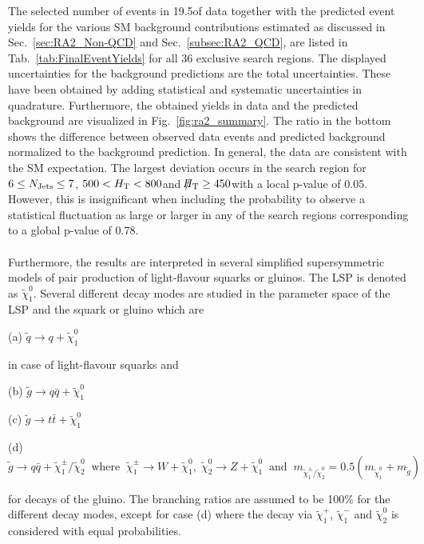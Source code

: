 The selected number of events in 19.5\fbinv of data together with the predicted event yields for the various SM background contributions estimated as discussed in Sec.~\ref{sec:RA2_Non-QCD} and Sec.~\ref{subsec:RA2_QCD}, are listed in Tab.~\ref{tab:FinalEventYields} for all 36 exclusive search regions. The displayed uncertainties for the background predictions are the total uncertainties. These have been obtained by adding statistical and systematic uncertainties in quadrature. Furthermore, the obtained yields in data and the predicted background are visualized in Fig.~\ref{fig:ra2_summary}. The ratio in the bottom shows the difference between observed data events and predicted background normalized to the background prediction. In general, the data are consistent with the SM expectation. The largest deviation occurs in the search region for $6 \leq N_{\text{Jets}} \leq 7$, $500 < H_{\text{T}} < 800$\gev and $\slash\mkern-12mu{H}_{\text{T}} \ge 450$\gev with a local p-value of 0.05. However, this is insignificant when including the probability to observe a statistical fluctuation as large or larger in any of the search regions corresponding to a global p-value of 0.78. \\
\\
Furthermore, the results are interpreted in several simplified supersymmetric models of pair production of light-flavour squarks or gluinos. The LSP is denoted as $\tilde{\chi}_1^0$. Several different decay modes are studied in the parameter space of the LSP and the squark or gluino which are
\begin{description}
\item (a) $\tilde{q} \rightarrow q + \tilde{\chi}_1^0$
\end{description} 
in case of light-flavour squarks and
\begin{description}
\item (b) $\tilde{g} \rightarrow q\bar{q} + \tilde{\chi}_1^0$
\item (c) $\tilde{g} \rightarrow t\bar{t} + \tilde{\chi}_1^0$
\item (d) $\tilde{g} \rightarrow q\bar{q} + \tilde{\chi}_1^{\pm}/\tilde{\chi}_2^0 \;\; \mathrm{where} \;\; \tilde{\chi}_1^{\pm} \rightarrow W + \tilde{\chi}_1^0, \; \tilde{\chi}_2^0 \rightarrow Z + \tilde{\chi}_1^0 \;\; \mathrm{and} \;\; m_{\tilde{\chi}_1^{\pm}/\tilde{\chi}_2^0} = 0.5(m_{{\tilde{\chi}^0_1}} + m_{\tilde{g}})$ 
\end{description}  
for decays of the gluino. The branching ratios are assumed to be 100\% for the different decay modes, except for case (d) where the decay via $\tilde{\chi}_1^{+}$, $\tilde{\chi}_1^{-}$ and $\tilde{\chi}_2^0$ is considered with equal probabilities. \\
